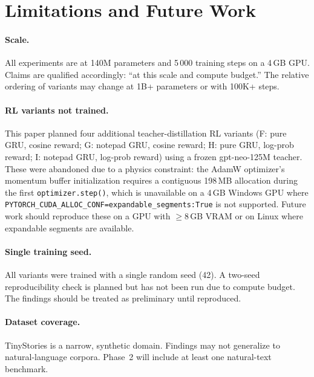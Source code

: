 \documentclass[11pt,a4paper]{article}
\begin{document}
\section{Limitations and Future Work}
\label{sec:limits}

\paragraph{Scale.}
All experiments are at 140M parameters and 5\,000 training steps on a
4\,GB GPU.  Claims are qualified accordingly: ``at this scale and compute
budget.''  The relative ordering of variants may change at 1B+ parameters
or with 100K+ steps.

\paragraph{RL variants not trained.}
This paper planned four additional teacher-distillation RL variants
(F: pure GRU, cosine reward; G: notepad GRU, cosine reward;
H: pure GRU, log-prob reward; I: notepad GRU, log-prob reward) using a
frozen gpt-neo-125M teacher.  These were abandoned due to a physics
constraint: the AdamW optimizer's momentum buffer initialization requires
a contiguous 198\,MB allocation during the first \texttt{optimizer.step()},
which is unavailable on a 4\,GB Windows GPU where
\texttt{PYTORCH\_CUDA\_ALLOC\_CONF=expandable\_segments:True} is not
supported.  Future work should reproduce these on a GPU with $\geq$8\,GB
VRAM or on Linux where expandable segments are available.

\paragraph{Single training seed.}
All variants were trained with a single random seed (42).  A two-seed
reproducibility check is planned but has not been run due to compute budget.
The findings should be treated as preliminary until reproduced.

\paragraph{Dataset coverage.}
TinyStories is a narrow, synthetic domain.  Findings may not generalize to
natural-language corpora.  Phase~2 will include at least one natural-text
benchmark.
\end{document}
